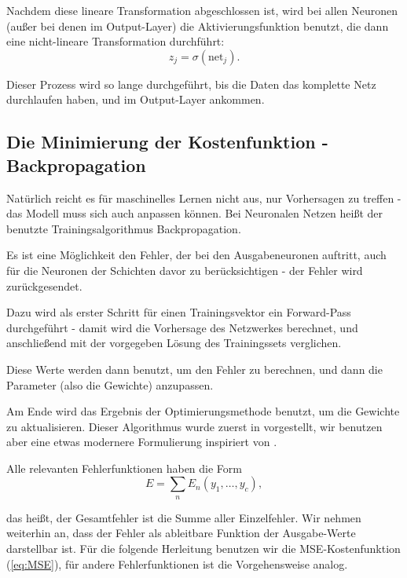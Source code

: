 Nachdem diese lineare Transformation abgeschlossen ist, wird bei allen Neuronen (außer bei denen im Output-Layer) die Aktivierungsfunktion benutzt, die dann eine nicht-lineare Transformation durchführt: 
\begin{equation}
\label{eq:feedforward2}
z_j = \sigma (\text{net}_j).
\end{equation}

Dieser Prozess wird so lange durchgeführt, bis die Daten das komplette Netz durchlaufen haben, und im Output-Layer ankommen\cite{bishop1995neural}.


\subsection{Die Minimierung der Kostenfunktion - Backpropagation}

Natürlich reicht es für maschinelles Lernen nicht aus, nur Vorhersagen zu treffen - das Modell muss sich auch anpassen können. Bei Neuronalen Netzen heißt der benutzte Trainingsalgorithmus Backpropagation.

Es ist eine Möglichkeit den Fehler, der bei den Ausgabeneuronen auftritt, auch für die Neuronen der Schichten davor zu berücksichtigen - der Fehler wird zurückgesendet.

Dazu wird als erster Schritt für einen Trainingsvektor ein Forward-Pass durchgeführt - damit wird die Vorhersage des Netzwerkes berechnet, und anschließend mit der vorgegeben Lösung des Trainingssets verglichen.

Diese Werte werden dann benutzt, um den Fehler zu berechnen, und dann die Parameter (also die Gewichte) anzupassen.

Am Ende wird das Ergebnis der Optimierungsmethode benutzt, um die Gewichte zu aktualisieren. Dieser Algorithmus wurde zuerst in \cite{rumelhart1988learning} vorgestellt, wir benutzen aber eine etwas modernere Formulierung inspiriert von \cite{bishop1995neural, duda2012pattern}. 

Alle relevanten Fehlerfunktionen haben die Form 
\begin{equation}
E = \sum_n E_n(y_1, \ldots, y_c),
\end{equation}

das heißt, der Gesamtfehler ist die Summe aller Einzelfehler.
Wir nehmen weiterhin an, dass der Fehler als ableitbare Funktion der Ausgabe-Werte darstellbar ist.
Für die folgende Herleitung benutzen wir die MSE-Kostenfunktion (\ref{eq:MSE}), für andere Fehlerfunktionen ist die Vorgehensweise analog.

